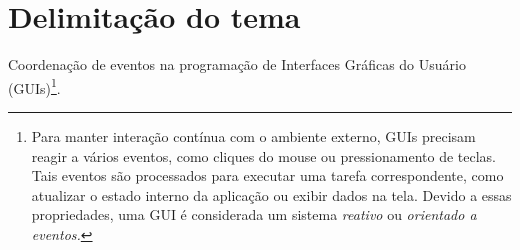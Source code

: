 \section{Delimitação do tema}\label{ldelimitacao}

Coordenação de eventos na programação de Interfaces Gráficas
do Usuário (GUIs)\footnote{
  Para manter interação contínua com o ambiente externo, GUIs
  precisam reagir a vários eventos, como cliques do mouse ou
  pressionamento de teclas.
  Tais eventos são processados para
  executar uma tarefa correspondente, como atualizar o estado interno
  da aplicação ou exibir dados na tela.
  Devido a essas propriedades, uma GUI é considerada um sistema
  \emph{reativo} ou \emph{orientado a eventos.}
}.
